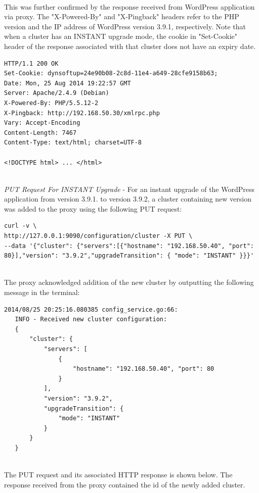 \documentclass[a4paper,11pt,twoside]{report}
\begin{document}
\noindent\\
This was further confirmed by the response received from WordPress application via proxy. The "X-Powered-By" and "X-Pingback" headers refer to the PHP version and the IP address of WordPress version 3.9.1, respectively. Note that when a cluster has an INSTANT upgrade mode, the cookie in "Set-Cookie" header of the response associated with that cluster does not have an expiry date. \smallskip  

\begin{lstlisting}[language=terminal] 
HTTP/1.1 200 OK
Set-Cookie: dynsoftup=24e90b08-2c8d-11e4-a649-28cfe9158b63;
Date: Mon, 25 Aug 2014 19:22:57 GMT
Server: Apache/2.4.9 (Debian)
X-Powered-By: PHP/5.5.12-2
X-Pingback: http://192.168.50.30/xmlrpc.php
Vary: Accept-Encoding
Content-Length: 7467
Content-Type: text/html; charset=UTF-8

<!DOCTYPE html> ... </html>
\end{lstlisting} 

\noindent\\
\textit{PUT Request For INSTANT Upgrade} - For an instant upgrade of the WordPress application from version 3.9.1. to version 3.9.2, a cluster containing new version was added to the proxy using the following PUT request: \smallskip 

\begin{lstlisting}[language=terminal] 
curl -v \
http://127.0.0.1:9090/configuration/cluster -X PUT \
--data '{"cluster": {"servers":[{"hostname": "192.168.50.40", "port": 80}],"version": "3.9.2","upgradeTransition": { "mode": "INSTANT" }}}'
\end{lstlisting}

\noindent\\
The proxy acknowledged addition of the new cluster by outputting the following message in the terminal: \smallskip 

\begin{lstlisting}[language=terminal] 
2014/08/25 20:25:16.080385 config_service.go:66:     
   INFO - Received new cluster configuration:
   {
       "cluster": {
           "servers": [
               {
                   "hostname": "192.168.50.40", "port": 80
               }
           ],
           "version": "3.9.2",
           "upgradeTransition": {
               "mode": "INSTANT"
           }
       }
   } 
\end{lstlisting}   

\noindent\\
The PUT request and its associated HTTP response is shown below. The response received from the proxy contained the id of the newly added cluster.\smallskip 
\end{document}
